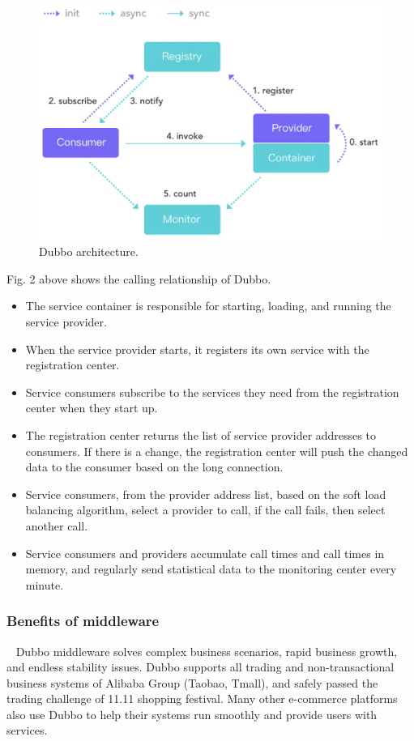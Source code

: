 \documentclass[conference]{IEEEtran}
\begin{document}
\begin{figure}[h]
\centering
\includegraphics[width=1\columnwidth]{dubbo}
\caption{Dubbo architecture.}
\label{fig}
\end{figure}

Fig. 2 above shows the calling relationship of Dubbo.

\begin{itemize}
\item The service container is responsible for starting, loading, and running the service provider.
\item When the service provider starts, it registers its own service with the registration center.
\item Service consumers subscribe to the services they need from the registration center when they start up.
\item The registration center returns the list of service provider addresses to consumers. If there is a change, the registration center will push the changed data to the consumer based on the long connection.
\item Service consumers, from the provider address list, based on the soft load balancing algorithm, select a provider to call, if the call fails, then select another call.
\item Service consumers and providers accumulate call times and call times in memory, and regularly send statistical data to the monitoring center every minute.
\end{itemize}


\subsubsection{Benefits of middleware}
\
\newline
\indent
Dubbo middleware solves complex business scenarios, rapid business growth, and endless stability issues. Dubbo supports all trading and non-transactional business systems of Alibaba Group (Taobao, Tmall), and safely passed the trading challenge of 11.11 shopping festival.
Many other e-commerce platforms also use Dubbo to help their systems run smoothly and provide users with services.
\end{document}
